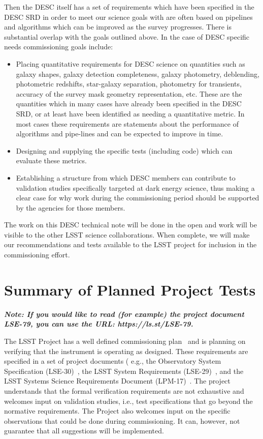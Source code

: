 \documentclass[modern]{desc-tex/styles/lsstdescnote}
\begin{document}
Then the DESC itself has a set of requirements which have been specified in the DESC SRD in order to meet our science goals with are often based on pipelines and algorithms which can be improved as the survey progresses. There is substantial overlap with the goals outlined above.  In the case of DESC specific needs commissioning goals include:

\begin{itemize}

\item Placing quantitative requirements for DESC science on quantities such as galaxy shapes, galaxy detection completeness, galaxy photometry, deblending, photometric redshifts, star-galaxy separation, photometry for transients, accuracy of the survey mask geometry representation, etc.  These are the quantities which in many cases have already been specified in the DESC SRD, or at least have been identified as needing a quantitative metric.  In most cases these requirements are statements about the performance of algorithms and pipe-lines and can be expected to improve in time.

\item Designing and supplying the specific tests (including code) which can evaluate these metrics.

\item Establishing a structure from which DESC members can contribute to validation studies specifically targeted at dark energy science, thus making a clear case for why work during the commissioning period should be supported by the agencies for those members.
  
\end{itemize}

The work on this DESC technical note will be done in the open and work will be visible to the other LSST science collaborations.  When complete, we will make our recommendations and tests available to the LSST project for inclusion in the commissioning effort.

\section{Summary of Planned Project Tests}
\label{sec:project-tests}

{\bf \it Note: If you would like to read (for example) the project
  document LSE-79, you can use the URL: https://ls.st/LSE-79.}

The LSST Project has a well defined commissioning plan~\cite{LSE-79} and is planning on verifying that the instrument is operating as designed.  These requirements are specified in a set of project documents ( e.g., the Observatory System Specification (LSE-30)~\cite{LSE-30}, the LSST System Requirements (LSE-29)~\cite{LSE-29}, and the LSST Systems Science Requirements Document (LPM-17)~\cite{LPM-17}. The project understands that the formal verification requirements are not exhaustive and welcomes input on validation studies, i.e., test specifications that go beyond the normative requirements. The Project also welcomes input on the specific observations that could be done during commissioning. It can, however, not guarantee that all suggestions will be implemented.
\end{document}
